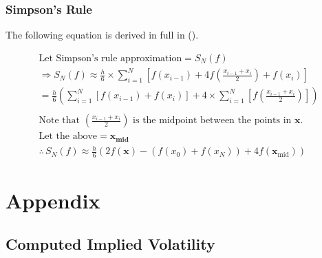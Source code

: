 \documentclass[10pt]{article}
\newcommand*\lstinputpath[1]{\lstset{inputpath=#1}} %
\begin{document}
        

        \subsubsection{Simpson's Rule}

        The following equation is derived in full in (\cite{Florescu2019}).

        \begin{gather*}
            \text{Let Simpson's rule approximation} = S_N(f) \\
            \Rightarrow S_N(f) \approx \frac{h}{6} \times \sum_{i=1}^N \left[ f(x_{i-1}) + 4f \left( \frac{x_{i-1} + x_i}{2} \right) + f(x_i) \right] \\
            = \frac{h}{6} \left( \sum_{i=1}^N [f(x_{i-1}) + f(x_i)] + 4 \times \sum_{i=1}^N \left[ f \left( \frac{x_{i-1} + x_i}{2} \right) \right] \right) \\
            \\
            \text{Note that $\left( \frac{x_{i-1} + x_i}{2} \right)$ is the midpoint between the points in $\boldsymbol{x}$.} \\
            \text{Let the above} = \boldsymbol{x_\text{mid}} \\
            \therefore \, S_N(f) \approx \frac{h}{6} \left( 2f(\boldsymbol{x}) - (f(x_0) + f(x_N)) + 4f(\boldsymbol{x}_\text{mid}) \right)
        \end{gather*}

        


\newpage

\printbibliography



\newpage

\appendix

\lstinputpath{}

\section{Appendix} \label{appendix:source}

    \subsection{Computed Implied Volatility} \label{appendix:q2:imp_vol}
        
\end{document}
